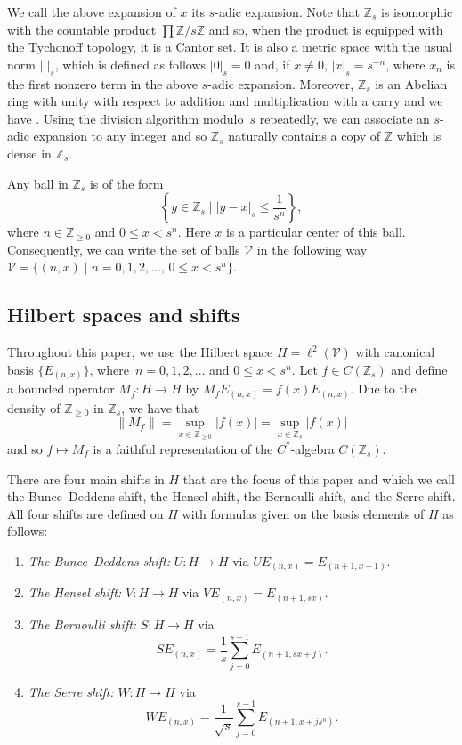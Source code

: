 \documentclass[10pt,a4paper]{amsart}
\newcommand{\Z}{{\mathbb Z}}
\numberwithin{equation}{section}
\begin{document}
We call the above expansion of $x$ its $s$-adic expansion. Note that $\Z_s$ is isomorphic with the countable product $\prod \Z/s\Z$ and so, when the product is equipped with the Tychonoff topology, it is a Cantor set. It is also a metric space with the usual norm $|\cdot|_s$, which is defined as follows
$
|0|_s=0$ and, if $x\ne 0$, $ |x|_s=s^{-n}$,
where $x_n$ is the first nonzero term in the above $s$-adic expansion.
Moreover, $\Z_s$ is an Abelian ring with unity with respect to addition and multiplication with a carry and we have
\smash{$\Z_s\cong\lim\limits_{\longleftarrow}\Z/s^n\Z$}.
Using the division algorithm modulo~$s$ repeatedly, we can associate an $s$-adic expansion to any integer and so $\Z_s$ naturally contains a copy of $\Z$ which is dense in $\Z_s$.

Any ball in $\Z_s$ is of the form
\begin{equation*}
\left\{y\in\Z_s\mid |y-x|_s\le\frac{1}{s^n}\right\},
\end{equation*}
where $n\in\Z_{\ge0}$ and $0\le x<s^n$. Here $x$ is a particular center of this ball. Consequently, we can write the set of balls $\mathcal{V}$ in the following way
$
\mathcal{V}=\{(n,x)\mid n=0,1,2,\dots,\, 0\le x<s^n\} $.

\subsection{Hilbert spaces and shifts}

Throughout this paper, we use the Hilbert space $H=\ell^2(\mathcal{V})$ with canonical basis $\{E_{(n,x)}\}$, where~${n=0,1,2,\dots}$ and $0\le x<s^n$. Let $f\in C(\Z_s)$ and define a bounded operator $M_f\colon H\to H$ by
$M_fE_{(n,x)}=f(x)E_{(n,x)}$.
Due to the density of $\Z_{\ge0}$ in $\Z_s$, we have that
\begin{equation*}
\|M_f\| = \sup_{x\in\Z_{\ge0}}{|f(x)|} = \sup_{x\in\Z_s}{|f(x)|}
\end{equation*}
and so $f\mapsto M_f$ is a faithful representation of the $C^*$-algebra $C(\Z_s)$.

There are four main shifts in $H$ that are the focus of this paper and which we call the Bunce--Deddens shift, the Hensel shift, the Bernoulli shift, and the Serre shift. All four shifts are defined on $H$ with formulas given on the basis elements of $H$ as follows:
\begin{enumerate}\itemsep=0pt
\item[(1)] \textit{The Bunce--Deddens shift:} $U\colon H\to H$ via
$
UE_{(n,x)}= E_{(n+1, x+1)}$.
\item[(2)] \textit{The Hensel shift:} $V\colon H\to H$ via
$
VE_{(n,x)} = E_{(n+1, sx)}$.
\item[(3)] \textit{The Bernoulli shift:} $S\colon H\to H$ via
\begin{equation*}
SE_{(n,x)}=\frac{1}{s}\sum_{j=0}^{s-1}E_{(n+1, sx+j)} .
\end{equation*}
\item[(4)] \textit{The Serre shift:} $W\colon H\to H$ via
\begin{equation*}
WE_{(n,x)} = \frac{1}{\sqrt{s}}\sum_{j=0}^{s-1}E_{(n+1, x+js^n)} .
\end{equation*}
\end{enumerate}
\end{document}

